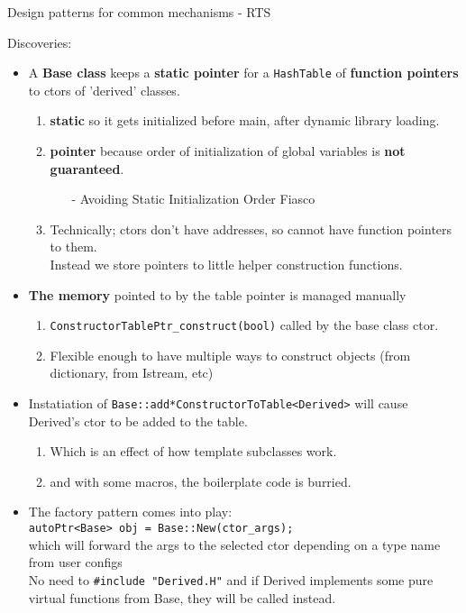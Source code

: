 \begin{frame}{Design patterns for common mechanisms - RTS}

Discoveries:

\begin{itemize}
    \item A {\bf Base class} keeps a {\bf static pointer} for a {\tt HashTable}
        of {\bf function pointers} to ctors of 'derived' classes.
        \begin{enumerate}
            \item {\bf static} so it gets initialized before main, after dynamic library loading.
            \item {\bf pointer} because order of initialization of global variables is {\bf not guaranteed}.
            \begin{itemize}
                \item [-] Avoiding Static Initialization Order Fiasco
            \end{itemize}
            \item Technically; ctors don't have addresses, so cannot have function pointers to them.\\
                Instead we store pointers to little helper construction functions.
        \end{enumerate}
    \item {\bf The memory} pointed to by the table pointer is managed manually
        \begin{enumerate}
            \item {\tt \*ConstructorTablePtr\_construct(bool)} called by the base class ctor.
            \item Flexible enough to have multiple ways to construct objects (from dictionary, from Istream, etc)
        \end{enumerate}
    \pagebreak
    \item Instatiation of \texttt{Base::add*ConstructorToTable<Derived>} will cause Derived's ctor to be added to the table.
        \begin{enumerate}
            \item Which is an effect of how template subclasses work.
            \item and with some macros, the boilerplate code is burried.
        \end{enumerate}
    \item The factory pattern comes into play:\\
        \texttt{autoPtr<Base> obj = Base::New(ctor_args);}\\
        which will forward the args to the selected ctor depending on a type name from user configs\\
        No need to \texttt{#include "Derived.H"} and if Derived implements some
        pure virtual functions from Base, they will be called instead.
\end{itemize}
\end{frame}


